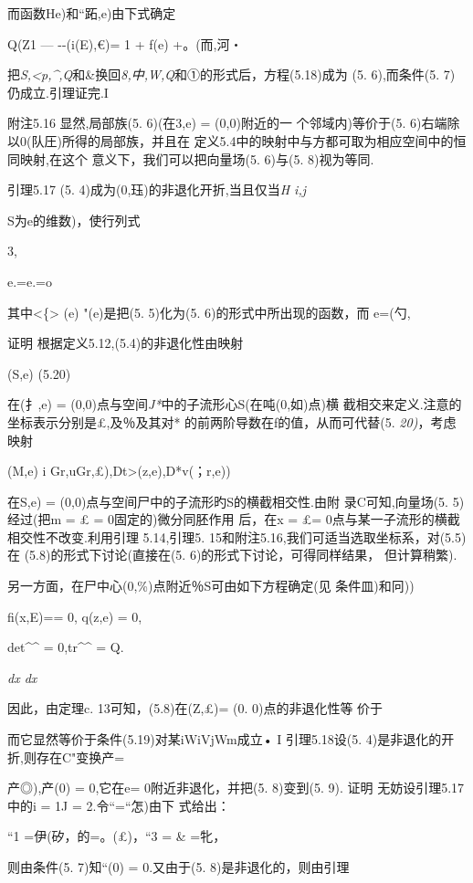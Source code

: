 \documentclass{article}
\begin{document}
而函数He)和``跖,e)由下式确定

Q(Z1 --- -\textbar{}-(i(E),€)= 1 + f(e) +。(而,河・

把\emph{S,\textless{}p,\^{},Q}和\&换回\emph{8,中,W,Q}和①的形式后，方程(5.18)成为
(5. 6),而条件(5. 7)仍成立.引理证完.I

附注5.16 显然,局部族(5. 6)(在3,e) = (0,0)附近的一 个邻域内)等价于(5.
6)右端除以0(队圧)所得的局部族，并且在
定义5.4中的映射中与方都可取为相应空间中的恒同映射,在这个
意义下，我们可以把向量场(5. 6)与(5. 8)视为等同.

引理5.17 (5. 4)成为(0,珏)的非退化开折,当且仅当\emph{H i,j}

S为e的维数)，使行列式

3,

e.=e.=o

其中\textless{}\{\textgreater{} (e) "(e)是把(5. 5)化为(5.
6)的形式中所出现的函数，而 e=(勺,

证明 根据定义5.12,(5.4)的非退化性由映射

(S,e) (5.20)

在(扌,e) = (0,0)点与空间\emph{J*}中的子流形心S(在吨(0,如)点)横
截相交来定义.注意的坐标表示分别是£,及％及其对*
的前两阶导数在f的值，从而可代替(5. \emph{20)}，考虑映射

(M,e) i Gr,uGr,£),Dt\textgreater{}(z,e),D*v(；r,e))

在S,e) = (0,0)点与空间尸中的子流形旳S的横截相交性.由附 录C可知,向量场(5.
5)经过(把m = £ = 0固定的)微分同胚作用 后，在x = £=
0点与某一子流形的横截相交性不改变.利用引理 5.14,引理5.
15和附注5.16,我们可适当选取坐标系，对(5.5)在 (5.8)的形式下讨论(直接在(5.
6)的形式下讨论，可得同样结果， 但计算稍繁).

另一方面，在尸中心(0,\%)点附近％S可由如下方程确定(见 条件皿)和冋))

fi(x,E)== 0, q(z,e) = 0,

det\^{}\^{} = 0,tr\^{}\^{} = Q.

\emph{dx dx}

因此，由定理c. 13可知，(5.8)在(Z,£)= (0. 0)点的非退化性等 价于

而它显然等价于条件(5.19)对某iWiVjWm成立• I 引理5.18设(5.
4)是非退化的开折,则存在C"变换产=

产◎),产(0) = 0,它在e= 0附近非退化，并把(5. 8)变到(5. 9). 证明
无妨设引理5.17中的i = 1J = 2.令``=``怎)由下 式给出：

``1 =伊(矽，的=。(£)，``3 = \& =牝，

则由条件(5. 7)知``(0) = 0.又由于(5. 8)是非退化的，则由引理
\end{document}
